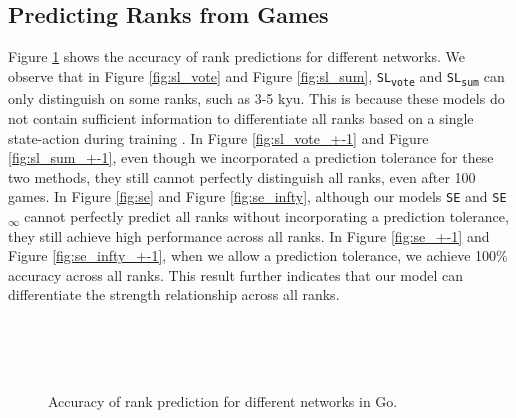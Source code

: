 \subsection{Predicting Ranks from Games}
\label{subsec:details_of_prediction}
Figure \ref{each_rank_prediction} shows the accuracy of rank predictions for different networks. 
We observe that in Figure \ref{fig:sl_vote} and Figure \ref{fig:sl_sum}, \texttt{SL\textsubscript{vote}} and \texttt{SL\textsubscript{sum}} can only distinguish on some ranks, such as 3-5 kyu.
This is because these models do not contain sufficient information to differentiate all ranks based on a single state-action during training \citep{moudřík_determining_2016}.
In Figure \ref{fig:sl_vote_+-1} and Figure \ref{fig:sl_sum_+-1}, even though we incorporated a prediction tolerance for these two methods, they still cannot perfectly distinguish all ranks, even after 100 games.
In Figure \ref{fig:se} and Figure \ref{fig:se_infty}, although our models \texttt{SE} and \texttt{SE\textsubscript{$\infty$}} cannot perfectly predict all ranks without incorporating a prediction tolerance, they still achieve high performance across all ranks.
In Figure \ref{fig:se_+-1} and Figure \ref{fig:se_infty_+-1}, when we allow a prediction tolerance, we achieve 100\% accuracy across all ranks. 
This result further indicates that our model can differentiate the strength relationship across all ranks.

\begin{figure}[ht]
\centering
    \\
    \\
    \\
    
    \caption{Accuracy of rank prediction for different networks in Go.}
    \label{each_rank_prediction}
\end{figure}

